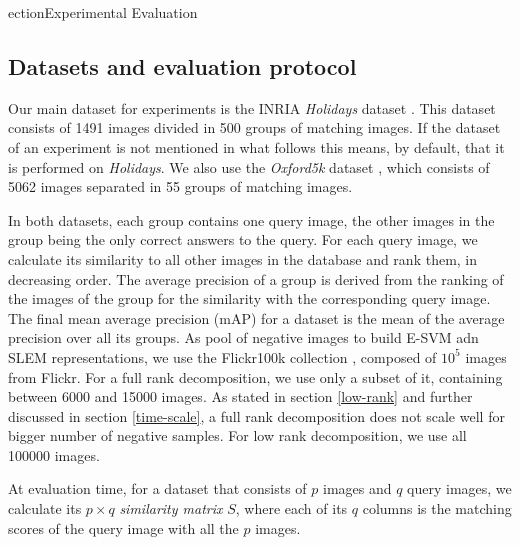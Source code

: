 ection{Experimental Evaluation}
\label{eval}

\subsection{Datasets and evaluation protocol} \label{eval:protocol}
Our main dataset for experiments is the INRIA \emph{Holidays} dataset \cite{holidays}. This dataset consists of 1491 images divided in 500 groups of matching images. If the dataset of an experiment is not mentioned in what follows this means, by default, that it is performed on \emph{Holidays}.
We also use  the \emph{Oxford5k} dataset \cite{oxford}, which consists of 5062 images separated in 55 groups of matching images.

In both datasets, each group contains one query image, the other images in the group being the only correct answers to the query.
For each query image, we calculate its similarity to all other images in the database and rank them, in decreasing order.
The average precision of a group is derived from the ranking of the images of the group for the similarity with the corresponding query image.
The final mean average precision (mAP) for a dataset is the mean of the average precision over all its groups.
As pool of negative images to build E-SVM adn SLEM representations, we use the Flickr100k collection \cite{oxford}, composed of $10^5$ images from Flickr. For a full rank decomposition, we use only a subset of it, containing between 6000 and 15000 images.
As stated in section \ref{low-rank} and further discussed in section \ref{time-scale}, a full rank decomposition does not scale well for bigger number of negative samples. For low rank decomposition, we use all 100000 images.

At evaluation time, for a dataset that consists of $p$ images and $q$ query images, we calculate its $p\times q$ \emph{similarity matrix} $S$, where each of its $q$ columns is the matching scores of the query image with all the $p$ images.



